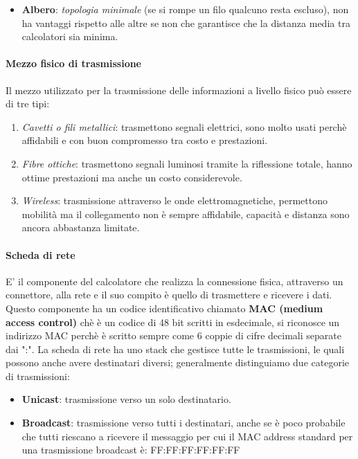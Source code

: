\documentclass{article}
\begin{document}
\begin{itemize}
          distanze e due dispositivi non possono comunicare nello stesso momento (\textbf{collisione}). Per evitare collisioni inizialmente si ascoltava la dorsale: se era libera si trasmetteva se inveece era
          occupata si aspettava un tempo random e si riprovava ma anche questo non proteggeva al 100\% dalle collisioni per cui servirebbe un token ma a quel punto risulterebbe un anello fatto male.
    \item \textbf{Albero}: \textit{topologia minimale} (se si rompe un filo qualcuno resta escluso), non ha vantaggi rispetto alle altre se non che garantisce che la distanza media tra calcolatori sia minima.
\end{itemize}

\paragraph{Mezzo fisico di trasmissione}
Il mezzo utilizzato per la trasmissione delle informazioni a livello fisico può
essere di tre tipi:
\begin{enumerate}
    \item \textit{Cavetti o fili metallici}: trasmettono segnali elettrici, sono molto usati perchè affidabili e con buon compromesso tra costo e prestazioni.
    \item \textit{Fibre ottiche}: trasmettono segnali luminosi tramite la riflessione totale, hanno ottime prestazioni ma anche un costo considerevole.
    \item \textit{Wireless}: trasmissione attraverso le onde elettromagnetiche, permettono mobilità ma il collegamento non è sempre affidabile, capacità e distanza sono ancora abbastanza limitate.
\end{enumerate}

\paragraph{Scheda di rete}
E' il componente del calcolatore che realizza la connessione fisica, attraverso
un connettore, alla rete e il suo compito è quello di trasmettere e ricevere i
dati. Questo componente ha un codice identificativo chiamato \textbf{MAC
    (medium access control)} chè è un codice di 48 bit scritti in esdecimale, si
riconosce un indirizzo MAC perchè è scritto sempre come 6 coppie di cifre
decimali separate dai ":". La scheda di rete ha uno stack che gestisce tutte le
trasmissioni, le quali possono anche avere destinatari diversi; generalmente
distinguiamo due categorie di trasmissioni:
\begin{itemize}
    \item \textbf{Unicast}: trasmissione verso un solo destinatario.
    \item \textbf{Broadcast}: trasmissione verso tutti i destinatari, anche se è poco probabile che tutti riescano a ricevere il messaggio per cui il MAC address standard per una trasmissione broadcast è: FF:FF:FF:FF:FF:FF
\end{itemize}
\end{document}
